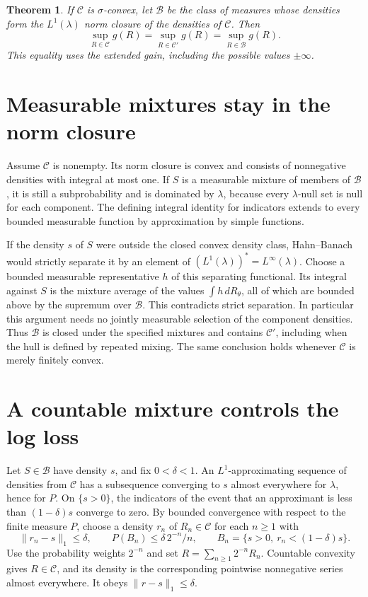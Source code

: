 \documentclass[11pt,a4paper]{amsart}
\newtheorem{theorem}{Theorem}
\begin{document}
\begin{theorem}\label{thm:main}
If \(\mathcal C\) is \(\sigma\)-convex, let \(\mathcal B\) be the class of measures whose densities form the \(L^1(\lambda)\) norm closure of the densities of \(\mathcal C\). Then
\[
 \sup_{R\in\mathcal C}g(R)=\sup_{R\in\mathcal C'}g(R)
                          =\sup_{R\in\mathcal B}g(R).
\]
This equality uses the extended gain, including the possible values \(\pm\infty\).
\end{theorem}

\section{Measurable mixtures stay in the norm closure}

Assume \(\mathcal C\) is nonempty. Its norm closure is convex and consists of nonnegative densities with integral at most one. If \(S\) is a measurable mixture of members of \(\mathcal B\), it is still a subprobability and is dominated by \(\lambda\), because every \(\lambda\)-null set is null for each component. The defining integral identity for indicators extends to every bounded measurable function by approximation by simple functions.

If the density \(s\) of \(S\) were outside the closed convex density class, Hahn--Banach would strictly separate it by an element of \((L^1(\lambda))^*=L^\infty(\lambda)\). Choose a bounded measurable representative \(h\) of this separating functional. Its integral against \(S\) is the mixture average of the values \(\int h\,dR_\theta\), all of which are bounded above by the supremum over \(\mathcal B\). This contradicts strict separation. In particular this argument needs no jointly measurable selection of the component densities. Thus \(\mathcal B\) is closed under the specified mixtures and contains \(\mathcal C'\), including when the hull is defined by repeated mixing. The same conclusion holds whenever \(\mathcal C\) is merely finitely convex.

\section{A countable mixture controls the log loss}

Let \(S\in\mathcal B\) have density \(s\), and fix \(0<\delta<1\). An \(L^1\)-approximating sequence of densities from \(\mathcal C\) has a subsequence converging to \(s\) almost everywhere for \(\lambda\), hence for \(P\). On \(\{s>0\}\), the indicators of the event that an approximant is less than \((1-\delta)s\) converge to zero. By bounded convergence with respect to the finite measure \(P\), choose a density \(r_n\) of \(R_n\in\mathcal C\) for each \(n\ge1\) with
\[
 \|r_n-s\|_1\le\delta,\qquad
 P(B_n)\le\delta\,2^{-n}/n,\qquad
 B_n=\{s>0,\ r_n<(1-\delta)s\}.
\]
Use the probability weights \(2^{-n}\) and set \(R=\sum_{n\ge1}2^{-n}R_n\). Countable convexity gives \(R\in\mathcal C\), and its density is the corresponding pointwise nonnegative series almost everywhere. It obeys \(\|r-s\|_1\le\delta\).
\end{document}
